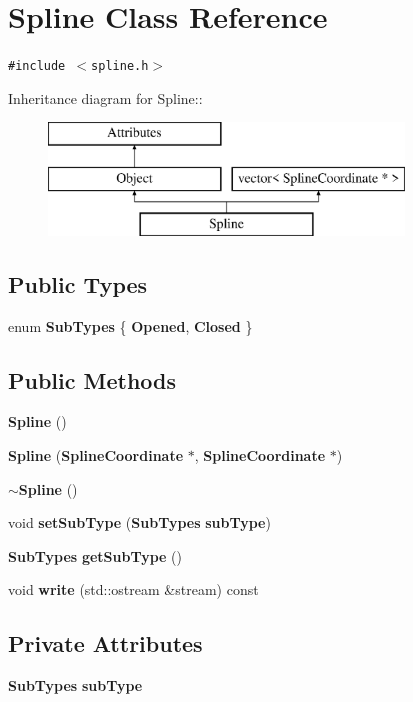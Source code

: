 \section{Spline Class Reference}
\label{classSpline}
{\tt \#include $<$spline.h$>$}

Inheritance diagram for Spline::\begin{figure}[H]
\begin{center}
\leavevmode
\includegraphics[height=3cm]{classSpline}
\end{center}
\end{figure}
\subsection*{Public Types}
\begin{CompactItemize}
\item 
enum {\bf Sub\-Types} \{ {\bf Opened}, 
{\bf Closed}
 \}
\end{CompactItemize}
\subsection*{Public Methods}
\begin{CompactItemize}
\item 
{\bf Spline} ()
\item 
{\bf Spline} ({\bf Spline\-Coordinate} $\ast$, {\bf Spline\-Coordinate} $\ast$)
\item 
{\bf $\sim$Spline} ()
\item 
void {\bf set\-Sub\-Type} ({\bf Sub\-Types} {\bf sub\-Type})
\item 
{\bf Sub\-Types} {\bf get\-Sub\-Type} ()
\item 
void {\bf write} (std::ostream \&stream) const
\end{CompactItemize}
\subsection*{Private Attributes}
\begin{CompactItemize}
\item 
{\bf Sub\-Types} {\bf sub\-Type}
\end{CompactItemize}


